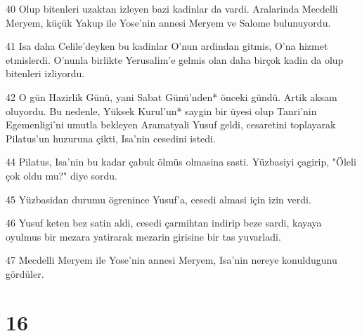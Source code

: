 \par 40 Olup bitenleri uzaktan izleyen bazi kadinlar da vardi. Aralarinda Mecdelli Meryem, küçük Yakup ile Yose'nin annesi Meryem ve Salome bulunuyordu.
\par 41 Isa daha Celile'deyken bu kadinlar O'nun ardindan gitmis, O'na hizmet etmislerdi. O'nunla birlikte Yerusalim'e gelmis olan daha birçok kadin da olup bitenleri izliyordu.
\par 42 O gün Hazirlik Günü, yani Sabat Günü'nden* önceki gündü. Artik aksam oluyordu. Bu nedenle, Yüksek Kurul'un* saygin bir üyesi olup Tanri'nin Egemenligi'ni umutla bekleyen Aramatyali Yusuf geldi, cesaretini toplayarak Pilatus'un huzuruna çikti, Isa'nin cesedini istedi.
\par 44 Pilatus, Isa'nin bu kadar çabuk ölmüs olmasina sasti. Yüzbasiyi çagirip, "Öleli çok oldu mu?" diye sordu.
\par 45 Yüzbasidan durumu ögrenince Yusuf'a, cesedi almasi için izin verdi.
\par 46 Yusuf keten bez satin aldi, cesedi çarmihtan indirip beze sardi, kayaya oyulmus bir mezara yatirarak mezarin girisine bir tas yuvarladi.
\par 47 Mecdelli Meryem ile Yose'nin annesi Meryem, Isa'nin nereye konuldugunu gördüler.

\chapter{16}


